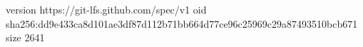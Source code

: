 version https://git-lfs.github.com/spec/v1
oid sha256:dd9e433ca8d101ae3df87d112b71bb664d77ce96c25969c29a87493510bcb671
size 2641
